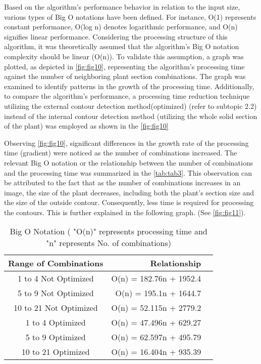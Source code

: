 \documentclass[]{iat}
\begin{document}
Based on the algorithm's performance behavior in relation to the input size, various types of Big O notations have been defined. For instance, O(1) represents constant performance, O(log n) denotes logarithmic performance, and O(n) signifies linear performance. Considering the processing structure of this algorithm, it was theoretically assumed that the algorithm's Big O notation complexity should be linear (O(n)). To validate this assumption, a graph was plotted, as depicted in \autoref{fig:fig10}, representing the algorithm's processing time against the number of neighboring plant section combinations. The graph was examined to identify patterns in the growth of the processing time. Additionally, to compare the algorithm's performance, a processing time reduction technique utilizing the external contour detection method(optimized) (refer to subtopic 2.2) instead of the internal contour detection method (utilizing the whole solid section of the plant) was employed as shown in the \autoref{fig:fig10}
\par
Observing \autoref{fig:fig10}, significant differences in the growth rate of the processing time (gradient) were noticed as the number of combinations increased. The relevant Big O notation or the relationship between the number of combinations and the processing time was summarized in the \autoref{tab:tab3}. This observation can be attributed to the fact that as the number of combinations increases in an image, the size of the plant decreases, including both the plant's section size and the size of the outside contour. Consequently, less time is required for processing the contours. This is further explained in the following graph. (See \autoref{fig:fig11}). 
\par
\FloatBarrier
\begin{table}[h]
\begin{tabular}{crl}
\hline
Range of Combinations & Relationship\\\hline
1 to 4 Not Optimized & O(n) = 182.76n + 1952.4 \\
5 to 9 Not Optimized & O(n) = 195.1n + 1644.7 \\
10 to 21 Not Optimized & O(n) = 52.115n + 2779.2 \\
1 to 4 Optimized & O(n) = 47.496n + 629.27 \\
5 to 9 Optimized & O(n) = 62.597n + 495.79 \\
10 to 21 Optimized & O(n) = 16.404n + 935.39 \\\hline
\end{tabular}
\caption{Big O Notation ( "O(n)" represents processing time and "n" represents No. of combinations)}
\label{tab:tab3}
\end{table}
\end{document}
